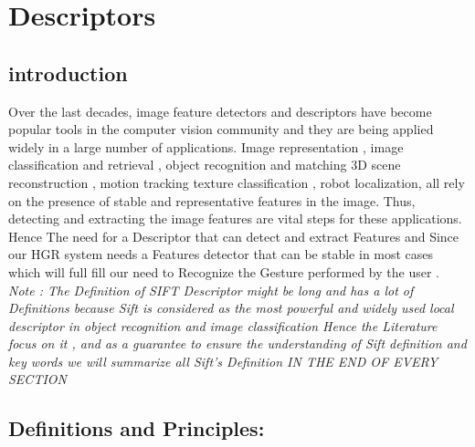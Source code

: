
\chapter{Descriptors}

\section{introduction}

Over the last decades, image feature detectors and descriptors have become popular tools in the computer vision community and they are being applied widely in a large number of applications. Image representation , image classification and retrieval  , object recognition and matching  3D scene reconstruction , motion tracking   texture classification , robot localization, all rely on the presence of stable and representative features in the image. Thus, detecting and extracting the image features are vital steps for these applications.
Hence The need for a Descriptor that can detect and extract Features 
and Since our HGR system needs a Features detector that can be stable in most cases which will  full fill our need to Recognize the Gesture performed by the user .\\

\textit{Note : The Definition of SIFT  Descriptor might be long and has a lot of Definitions because Sift is considered as the most  powerful and widely used local descriptor in object recognition and image classification Hence the Literature focus on it  , and as a guarantee  to ensure the understanding of  Sift definition and key words  we will summarize all Sift's  Definition  IN THE END OF EVERY SECTION }

\section{Definitions and Principles:}


